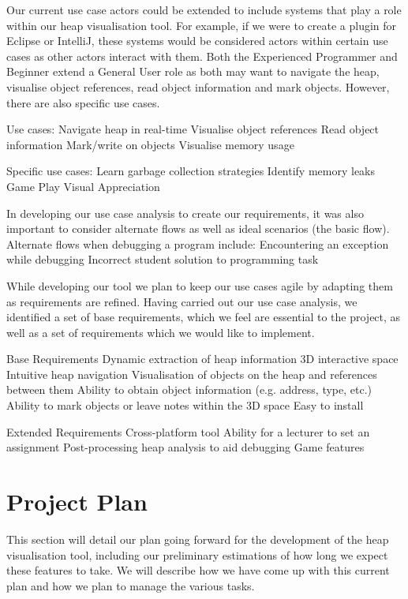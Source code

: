 \documentclass[10pt, a4paper]{article}
\begin{document}
Our current use case actors could be extended to include systems that play a role within our heap visualisation tool. For example, if we were to create a plugin for Eclipse or IntelliJ, these systems would be considered actors within certain use cases as other actors interact with them. Both the Experienced Programmer and Beginner extend a General User role as both may want to navigate the heap, visualise object references, read object information and mark objects. However, there are also specific use cases.

Use cases:
Navigate heap in real-time
Visualise object references
Read object information
Mark/write on objects 
Visualise memory usage

Specific use cases:
Learn garbage collection strategies
Identify memory leaks
Game Play
Visual Appreciation

In developing our use case analysis to create our requirements, it was also important to consider alternate flows as well as ideal scenarios (the basic flow). Alternate flows when debugging a program include:
Encountering an exception while debugging
Incorrect student solution to programming task

While developing our tool we plan to keep our use cases agile by adapting them as requirements are refined. Having carried out our use case analysis, we identified a set of base requirements, which we feel are essential to the project, as well as a set of requirements which we would like to implement.

Base Requirements
Dynamic extraction of heap information
3D interactive space
Intuitive heap navigation
Visualisation of objects on the heap and references between them
Ability to obtain object information (e.g. address, type, etc.) 
Ability to mark objects or leave notes within the 3D space
Easy to install

Extended Requirements
Cross-platform tool
Ability for a lecturer to set an assignment
Post-processing heap analysis to aid debugging
Game features

\section{Project Plan}

This section will detail our plan going forward for the development of the heap visualisation tool, including our preliminary estimations of how long we expect these features to take. We will describe how we have come up with this current plan and how we plan to manage the various tasks. 
\end{document}
